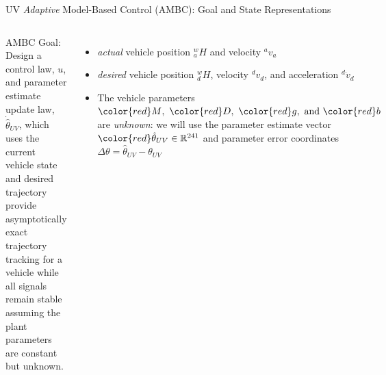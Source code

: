 \begin{frame}{UV {\it Adaptive} Model-Based Control (AMBC): Goal and State Representations}

 
 

   \begin{columns}
      
      AMBC Goal: Design a control law,
     {\color{green} $u$}, and parameter estimate update law, {\color{red}
       $\dot{\hat{\theta}}_{UV}$}, which uses the {\color{cyan}
       current vehicle state} and {\color{blue} desired trajectory}
     provide asymptotically exact trajectory tracking for a vehicle
     while all signals remain stable assuming the plant parameters are
     constant but unknown.  %


      \begin{itemize}
     \item<2-> {\it actual} vehicle position {\color{cyan} ${^w_a}H$
        } and velocity {\color{cyan} ${^a}v_a$}
      \item<3-> {\it desired} vehicle position {\color{blue}
          ${^w_d}H$}, velocity {\color{blue} ${^d}v_d$}, and
        acceleration {\color{blue} ${^d}\dot{v}_d$}
      \item<4-> The vehicle parameters ${\color{red} M},~{\color{red}
          D},~{\color{red} g},~\text{and}~{\color{red} b}$ are {\it
          unknown}: we will use the parameter estimate vector
        ${\color{red} \hat{\theta}_{UV}}\in\rSp{241}$ and parameter
        error coordinates $\Delta\theta=\hat{\theta}_{UV}-\theta_{UV}$
      \end{itemize}
%
      \vspace*{10mm}
%

%
     
  \end{columns}
\end{frame}




